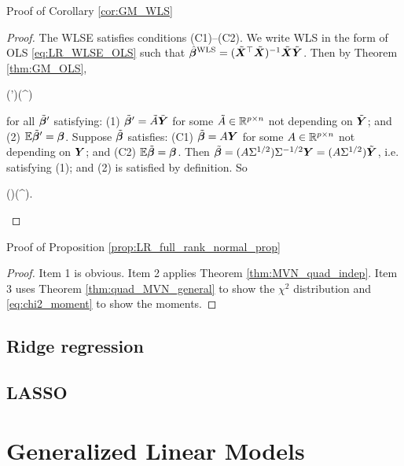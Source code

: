 \documentclass[10pt,a4paper]{book}
\begin{document}
\begin{pfbox}{Proof of Corollary \ref{cor:GM_WLS}}
	\begin{proof}
		The WLSE satisfies conditions (C1)--(C2).
		We write WLS in the form of OLS \eqref{eq:LR_WLSE_OLS} such that $\hat{{\boldsymbol\beta}}^{\mathrm{WLS}}=(\tilde{{\boldsymbol X}}^\top\tilde{{\boldsymbol X}})^{-1}\tilde{{\boldsymbol X}}\tilde{{\boldsymbol Y}}$. 
		Then by Theorem \ref{thm:GM_OLS}, 
		\begin{sequation*}
			\Cov(\tilde{\bab}')\succeq \Cov(\hat{\bab}^{\WLS})
		\end{sequation*}
		for all $\tilde{{\boldsymbol\beta}}'$ satisfying: (1) $\tilde{{\boldsymbol\beta}}'=\tilde{A}\tilde{{\boldsymbol Y}}$ for some $\tilde{A}\in\mathbb R^{p\times n}$ not depending on $\tilde{{\boldsymbol Y}}$; and (2) $\mathbb E\tilde{{\boldsymbol\beta}}'={\boldsymbol\beta}$.
		Suppose $\tilde{{\boldsymbol\beta}}$ satisfies: (C1) $\tilde{{\boldsymbol\beta}}=A{\boldsymbol Y}$ for some $A\in\mathbb R^{p\times n}$ not depending on ${\boldsymbol Y}$; and (C2) $\mathbb E\tilde{{\boldsymbol\beta}}={\boldsymbol\beta}$.
		Then $\tilde{{\boldsymbol\beta}}=(A\Sigma^{1/2})\Sigma^{-1/2}{\boldsymbol Y}=(A\Sigma^{1/2})\tilde{{\boldsymbol Y}}$, i.e. satisfying (1); and (2) is satisfied by definition. 
		So 
		\begin{sequation*}
			\Cov(\tilde{\bab})\succeq \Cov(\hat{\bab}^{\WLS}).
		\end{sequation*}
	\end{proof}
\end{pfbox}

\begin{pfbox}{Proof of Proposition \ref{prop:LR_full_rank_normal_prop}}
	\begin{proof}
		Item 1 is obvious. Item 2 applies Theorem \ref{thm:MVN_quad_indep}. Item 3 uses Theorem \ref{thm:quad_MVN_general} to show the $\chi^2$ distribution and \eqref{eq:chi2_moment} to show the moments. 
	\end{proof}
\end{pfbox}
\section{Ridge regression}\label{sec:ridge_reg}



\section{LASSO}\label{sec:lasso}




\chapter{Generalized Linear Models}\label{chap:GLM}
\end{document}
